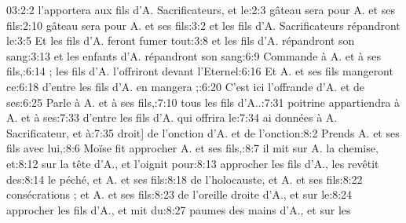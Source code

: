 \begin{multicols}{3}
{03:2:2	l'apportera aux fils d'A. Sacrificateurs, et le:2:3	gâteau sera pour A. et ses fils:2:10	gâteau sera pour A. et ses fils:3:2	et les fils d'A. Sacrificateurs répandront le:3:5	Et les fils d'A. feront fumer tout:3:8	et les fils d'A. répandront son sang:3:13	et les enfants d'A. répandront son sang:6:9	Commande à A. et à ses fils,:6:14	; les fils d'A. l'offriront devant l'Eternel:6:16	Et A. et ses fils mangeront ce:6:18	d'entre les fils d'A. en mangera ;:6:20	C'est ici l'offrande d'A. et de ses:6:25	Parle à A. et à ses fils,:7:10	tous les fils d'A..:7:31	poitrine appartiendra à A. et à ses:7:33	d'entre les fils d'A. qui offrira le:7:34	ai données à A. Sacrificateur, et à:7:35	droit] de l'onction d'A. et de l'onction:8:2	Prends A. et ses fils avec lui,:8:6	Moïse fit approcher A. et ses fils,:8:7	il mit sur A. la chemise, et:8:12	sur la tête d'A., et l'oignit pour:8:13	approcher les fils d'A., les revêtit des:8:14	le péché, et A. et ses fils:8:18	de l'holocauste, et A. et ses fils:8:22	consécrations ; et A. et ses fils:8:23	de l'oreille droite d'A., et sur le:8:24	approcher les fils d'A., et mit du:8:27	paumes des mains d'A., et sur les\newline
}
\end{multicols}

